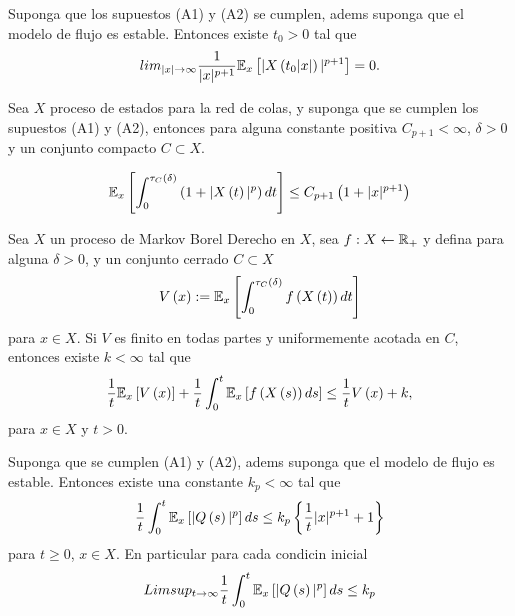 \begin{Prop}\label{Prop.5.1}
Suponga que los supuestos (A1) y (A2) se cumplen, adems suponga
que el modelo de flujo es estable. Entonces existe $t_{0}>0$ tal
que
\begin{equation}\label{Eq.Prop.5.1}
lim_{|x|\rightarrow\infty}\frac{1}{|x|^{p+1}}\mathbb{E}_{x}\left[|X\left(t_{0}|x|\right)|^{p+1}\right]=0.
\end{equation}

\end{Prop}


\begin{Prop}
Sea $X$ proceso de estados para la red de colas, y suponga que se
cumplen los supuestos (A1) y (A2), entonces para alguna constante
positiva $C_{p+1}<\infty$, $\delta>0$ y un conjunto compacto
$C\subset X$.

\begin{equation}\label{Eq.5.4}
\mathbb{E}_{x}\left[\int_{0}^{\tau_{C}\left(\delta\right)}\left(1+|X\left(t\right)|^{p}\right)dt\right]\leq
C_{p+1}\left(1+|x|^{p+1}\right)
\end{equation}
\end{Prop}

\begin{Prop}
Sea $X$ un proceso de Markov Borel Derecho en $X$, sea
$f:X\leftarrow\mathbb{R}_{+}$ y defina para alguna $\delta>0$, y un
conjunto cerrado $C\subset X$
\[V\left(x\right):=\mathbb{E}_{x}\left[\int_{0}^{\tau_{C}\left(\delta\right)}f\left(X\left(t\right)\right)dt\right]\]
para $x\in X$. Si $V$ es finito en todas partes y uniformemente
acotada en $C$, entonces existe $k<\infty$ tal que
\begin{equation}\label{Eq.5.11}
\frac{1}{t}\mathbb{E}_{x}\left[V\left(x\right)\right]+\frac{1}{t}\int_{0}^{t}\mathbb{E}_{x}\left[f\left(X\left(s\right)\right)ds\right]\leq\frac{1}{t}V\left(x\right)+k,
\end{equation}
para $x\in X$ y $t>0$.
\end{Prop}


\begin{Teo}
Suponga que se cumplen (A1) y (A2), adems suponga que el modelo
de flujo es estable. Entonces existe una constante $k_{p}<\infty$
tal que
\begin{equation}\label{Eq.5.13}
\frac{1}{t}\int_{0}^{t}\mathbb{E}_{x}\left[|Q\left(s\right)|^{p}\right]ds\leq
k_{p}\left\{\frac{1}{t}|x|^{p+1}+1\right\}
\end{equation}
para $t\geq0$, $x\in X$. En particular para cada condicin inicial
\begin{equation}\label{Eq.5.14}
Limsup_{t\rightarrow\infty}\frac{1}{t}\int_{0}^{t}\mathbb{E}_{x}\left[|Q\left(s\right)|^{p}\right]ds\leq
k_{p}
\end{equation}
\end{Teo}

